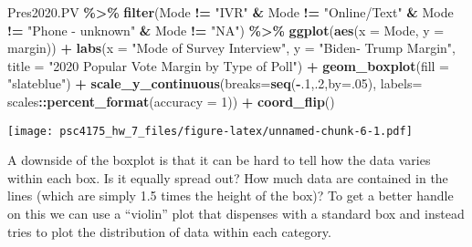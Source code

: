 \documentclass[
]{article}
\newenvironment{Shaded}{\begin{snugshade}}{\end{snugshade}}
\newcommand{\AttributeTok}[1]{\textcolor[rgb]{0.13,0.29,0.53}{#1}}
\newcommand{\DecValTok}[1]{\textcolor[rgb]{0.00,0.00,0.81}{#1}}
\newcommand{\FunctionTok}[1]{\textcolor[rgb]{0.13,0.29,0.53}{\textbf{#1}}}
\newcommand{\NormalTok}[1]{#1}
\newcommand{\SpecialCharTok}[1]{\textcolor[rgb]{0.81,0.36,0.00}{\textbf{#1}}}
\newcommand{\StringTok}[1]{\textcolor[rgb]{0.31,0.60,0.02}{#1}}
\begin{document}
\begin{Shaded}
\begin{Highlighting}[]
\NormalTok{Pres2020.PV }\SpecialCharTok{\%\textgreater{}\%} 
  \FunctionTok{filter}\NormalTok{(Mode }\SpecialCharTok{!=} \StringTok{"IVR"} \SpecialCharTok{\&}\NormalTok{ Mode }\SpecialCharTok{!=} \StringTok{"Online/Text"} \SpecialCharTok{\&}\NormalTok{ Mode }\SpecialCharTok{!=} \StringTok{"Phone {-} unknown"} \SpecialCharTok{\&}\NormalTok{ Mode }\SpecialCharTok{!=} \StringTok{"NA"}\NormalTok{) }\SpecialCharTok{\%\textgreater{}\%}
  \FunctionTok{ggplot}\NormalTok{(}\FunctionTok{aes}\NormalTok{(}\AttributeTok{x =}\NormalTok{ Mode, }\AttributeTok{y =}\NormalTok{ margin)) }\SpecialCharTok{+} 
    \FunctionTok{labs}\NormalTok{(}\AttributeTok{x =} \StringTok{"Mode of Survey Interview"}\NormalTok{,}
         \AttributeTok{y =} \StringTok{"Biden{-} Trump Margin"}\NormalTok{,}
         \AttributeTok{title =} \StringTok{"2020 Popular Vote Margin by Type of Poll"}\NormalTok{) }\SpecialCharTok{+}
    \FunctionTok{geom\_boxplot}\NormalTok{(}\AttributeTok{fill =} \StringTok{"slateblue"}\NormalTok{) }\SpecialCharTok{+}
    \FunctionTok{scale\_y\_continuous}\NormalTok{(}\AttributeTok{breaks=}\FunctionTok{seq}\NormalTok{(}\SpecialCharTok{{-}}\NormalTok{.}\DecValTok{1}\NormalTok{,.}\DecValTok{2}\NormalTok{,}\AttributeTok{by=}\NormalTok{.}\DecValTok{05}\NormalTok{),}
                     \AttributeTok{labels=}\NormalTok{ scales}\SpecialCharTok{::}\FunctionTok{percent\_format}\NormalTok{(}\AttributeTok{accuracy =} \DecValTok{1}\NormalTok{)) }\SpecialCharTok{+}
    \FunctionTok{coord\_flip}\NormalTok{()}
\end{Highlighting}
\end{Shaded}

\texttt{[image: psc4175\_hw\_7\_files/figure-latex/unnamed-chunk-6-1.pdf]}

A downside of the boxplot is that it can be hard to tell how the data
varies within each box. Is it equally spread out? How much data are
contained in the lines (which are simply 1.5 times the height of the
box)? To get a better handle on this we can use a ``violin'' plot that
dispenses with a standard box and instead tries to plot the distribution
of data within each category.
\end{document}
